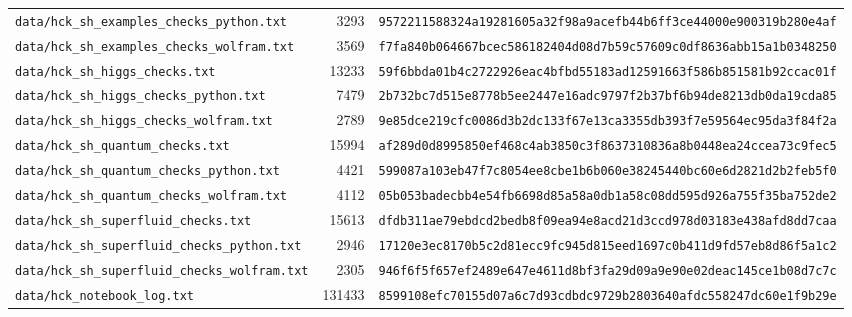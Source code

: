 \documentclass[aps,prd,onecolumn,superscriptaddress,nofootinbib,floatfix,longbibliography]{revtex4-2}
\begin{document}
\begin{longtable}{lrl}
\texttt{data/hck\_sh\_examples\_checks\_python.txt} & 3293 & \texttt{\scriptsize 9572211588324a19281605a32f98a9acefb44b6ff3ce44000e900319b280e4af} \\
\texttt{data/hck\_sh\_examples\_checks\_wolfram.txt} & 3569 & \texttt{\scriptsize f7fa840b064667bcec586182404d08d7b59c57609c0df8636abb15a1b0348250} \\
\texttt{data/hck\_sh\_higgs\_checks.txt} & 13233 & \texttt{\scriptsize 59f6bbda01b4c2722926eac4bfbd55183ad12591663f586b851581b92ccac01f} \\
\texttt{data/hck\_sh\_higgs\_checks\_python.txt} & 7479 & \texttt{\scriptsize 2b732bc7d515e8778b5ee2447e16adc9797f2b37bf6b94de8213db0da19cda85} \\
\texttt{data/hck\_sh\_higgs\_checks\_wolfram.txt} & 2789 & \texttt{\scriptsize 9e85dce219cfc0086d3b2dc133f67e13ca3355db393f7e59564ec95da3f84f2a} \\
\texttt{data/hck\_sh\_quantum\_checks.txt} & 15994 & \texttt{\scriptsize af289d0d8995850ef468c4ab3850c3f8637310836a8b0448ea24ccea73c9fec5} \\
\texttt{data/hck\_sh\_quantum\_checks\_python.txt} & 4421 & \texttt{\scriptsize 599087a103eb47f7c8054ee8cbe1b6b060e38245440bc60e6d2821d2b2feb5f0} \\
\texttt{data/hck\_sh\_quantum\_checks\_wolfram.txt} & 4112 & \texttt{\scriptsize 05b053badecbb4e54fb6698d85a58a0db1a58c08dd595d926a755f35ba752de2} \\
\texttt{data/hck\_sh\_superfluid\_checks.txt} & 15613 & \texttt{\scriptsize dfdb311ae79ebdcd2bedb8f09ea94e8acd21d3ccd978d03183e438afd8dd7caa} \\
\texttt{data/hck\_sh\_superfluid\_checks\_python.txt} & 2946 & \texttt{\scriptsize 17120e3ec8170b5c2d81ecc9fc945d815eed1697c0b411d9fd57eb8d86f5a1c2} \\
\texttt{data/hck\_sh\_superfluid\_checks\_wolfram.txt} & 2305 & \texttt{\scriptsize 946f6f5f657ef2489e647e4611d8bf3fa29d09a9e90e02deac145ce1b08d7c7c} \\
\texttt{data/hck\_notebook\_log.txt} & 131433 & \texttt{\scriptsize 8599108efc70155d07a6c7d93cdbdc9729b2803640afdc558247dc60e1f9b29e} \\
\end{longtable}
\endgroup


\end{document}
